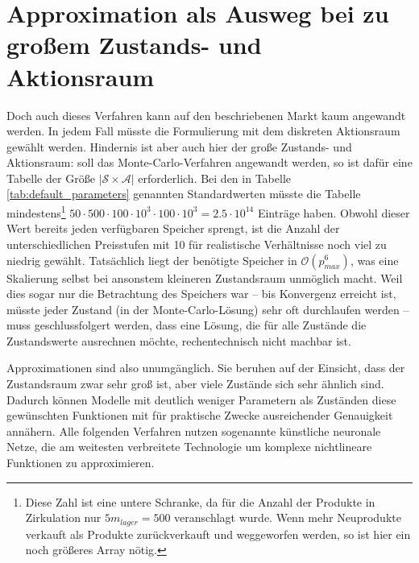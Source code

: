 \section{Approximation als Ausweg bei zu großem Zustands- und Aktionsraum}
Doch auch dieses Verfahren kann auf den beschriebenen Markt kaum angewandt werden.
In jedem Fall müsste die Formulierung mit dem diskreten Aktionsraum gewählt werden.
Hindernis ist aber auch hier der große Zustands- und Aktionsraum: soll das Monte-Carlo-Verfahren angewandt werden, so ist dafür eine Tabelle der Größe $|\mathcal{S} \times \mathcal{A}|$ erforderlich.
Bei den in Tabelle \ref{tab:default_parameters} genannten Standardwerten müsste die Tabelle mindestens\footnote{
	Diese Zahl ist eine untere Schranke, da für die Anzahl der Produkte in Zirkulation nur $5 m_{lager}=500$ veranschlagt wurde.
	Wenn mehr Neuprodukte verkauft als Produkte zurückverkauft und weggeworfen werden, so ist hier ein noch größeres Array nötig.
} $50 \cdot 500 \cdot 100 \cdot 10^3 \cdot 100 \cdot 10^3 = 2.5 \cdot 10^{14}$ Einträge haben.
Obwohl dieser Wert bereits jeden verfügbaren Speicher sprengt, ist die Anzahl der unterschiedlichen Preisstufen mit 10 für realistische Verhältnisse noch viel zu niedrig gewählt.
Tatsächlich liegt der benötigte Speicher in $\mathcal{O}\left(p_{max}^6\right)$, was eine Skalierung selbst bei ansonstem kleineren Zustandsraum unmöglich macht.
Weil dies sogar nur die Betrachtung des Speichers war -- bis Konvergenz erreicht ist, müsste jeder Zustand (in der Monte-Carlo-Lösung) sehr oft durchlaufen werden -- muss geschlussfolgert werden, dass eine Lösung, die für alle Zustände die Zustandswerte ausrechnen möchte, rechentechnisch nicht machbar ist.

Approximationen sind also unumgänglich.
Sie beruhen auf der Einsicht, dass der Zustandsraum zwar sehr groß ist, aber viele Zustände sich sehr ähnlich sind.
Dadurch können Modelle mit deutlich weniger Parametern als Zuständen diese gewünschten Funktionen  mit für praktische Zwecke ausreichender Genauigkeit annähern.
Alle folgenden Verfahren nutzen sogenannte künstliche neuronale Netze, die am weitesten verbreitete Technologie um komplexe nichtlineare Funktionen zu approximieren. \cite{lapan2020deep}

